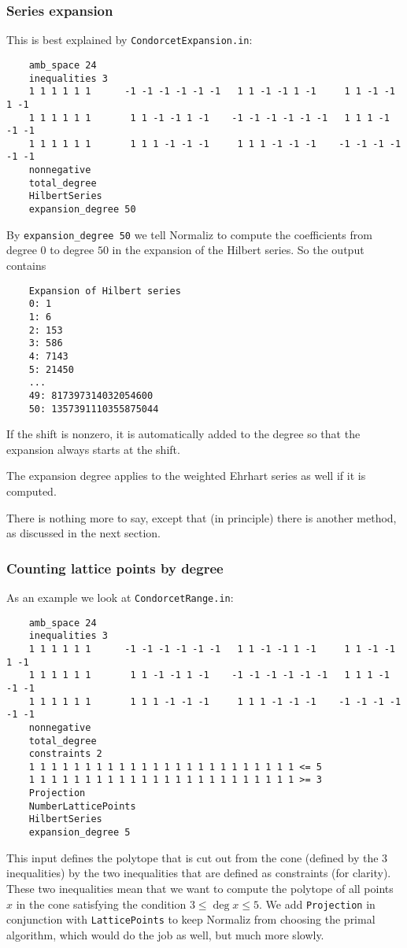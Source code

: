 \documentclass[12pt,a4paper]{scrartcl}
\theoremstyle{definition}
\begin{document}
{	\subsubsection{Series expansion}
	This is best explained by \verb|CondorcetExpansion.in|:
	\begin{Verbatim}
	amb_space 24
	inequalities 3
	1 1 1 1 1 1      -1 -1 -1 -1 -1 -1   1 1 -1 -1 1 -1     1 1 -1 -1 1 -1
	1 1 1 1 1 1       1 1 -1 -1 1 -1    -1 -1 -1 -1 -1 -1   1 1 1 -1 -1 -1
	1 1 1 1 1 1       1 1 1 -1 -1 -1     1 1 1 -1 -1 -1    -1 -1 -1 -1 -1 -1
	nonnegative
	total_degree
	HilbertSeries
	expansion_degree 50
	\end{Verbatim}
	By \verb|expansion_degree 50| we tell Normaliz to compute the coefficients from degree $0$ to degree $50$  in the expansion of the Hilbert series. So the output contains
	\begin{Verbatim}
	Expansion of Hilbert series
	0: 1
	1: 6
	2: 153
	3: 586
	4: 7143
	5: 21450
	...
	49: 817397314032054600
	50: 1357391110355875044
	\end{Verbatim}
	If the shift is nonzero, it is automatically added to the degree so that the expansion always starts at the shift. 
	
	The expansion degree applies to the weighted Ehrhart series as well if it is computed.
	
	There is nothing more to say, except that (in principle) there is another method, as discussed in the next section.
	
	\subsubsection{Counting lattice points by degree}\label{count}
	
	As an example we look at \verb|CondorcetRange.in|:
	\begin{Verbatim}
	amb_space 24
	inequalities 3
	1 1 1 1 1 1      -1 -1 -1 -1 -1 -1   1 1 -1 -1 1 -1     1 1 -1 -1 1 -1
	1 1 1 1 1 1       1 1 -1 -1 1 -1    -1 -1 -1 -1 -1 -1   1 1 1 -1 -1 -1
	1 1 1 1 1 1       1 1 1 -1 -1 -1     1 1 1 -1 -1 -1    -1 -1 -1 -1 -1 -1
	nonnegative
	total_degree
	constraints 2
	1 1 1 1 1 1 1 1 1 1 1 1 1 1 1 1 1 1 1 1 1 1 1 1 <= 5
	1 1 1 1 1 1 1 1 1 1 1 1 1 1 1 1 1 1 1 1 1 1 1 1 >= 3
	Projection
	NumberLatticePoints
	HilbertSeries
	expansion_degree 5
	\end{Verbatim}
	This input defines the polytope that is cut out from the cone (defined by the $3$ inequalities) by the two inequalities that are defined as constraints (for clarity). These two inequalities mean that we want to compute the polytope of all points $x$ in the cone satisfying the condition $3\le \deg x \le 5$. We add \verb|Projection| in conjunction with \verb|LatticePoints| to keep Normaliz from choosing the primal algorithm, which would do the job as well, but much more slowly.
	
}
\end{document}
